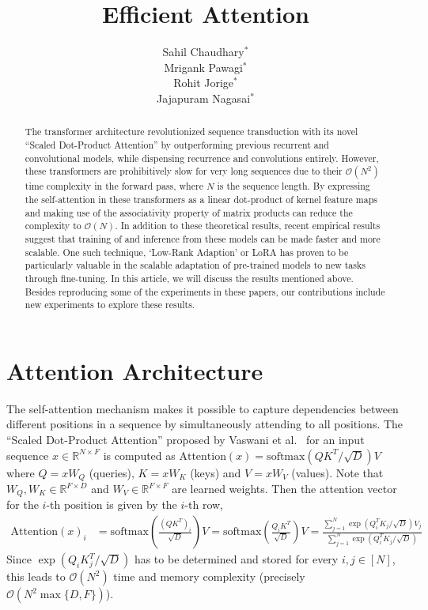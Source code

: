\documentclass{article}
\title{Efficient Attention}
\author{
  Sahil Chaudhary$^*$ \\
  \And
  Mrigank Pawagi$^*$ \\
  \And
  Rohit Jorige$^*$ \\
  \And
  Jajapuram Nagasai$^*$
}
\newcommand{\R}{\mathbb{R}}
\begin{document}
\maketitle

\def\thefootnote{*}
\def\thefootnote{\arabic{footnote}}

\begin{abstract}
    The transformer architecture revolutionized sequence transduction with its novel ``Scaled Dot-Product Attention'' by outperforming previous recurrent and convolutional models, while dispensing recurrence and convolutions entirely. However, these transformers are prohibitively slow for very long sequences due to their $\mathcal{O}(N^2)$ time complexity in the forward pass, where $N$ is the sequence length. By expressing the self-attention in these transformers as a linear dot-product of kernel feature maps and making use of the associativity property of matrix products can reduce the complexity to $\mathcal{O}(N)$. In addition to these theoretical results, recent empirical results suggest that training of and inference from these models can be made faster and more scalable. One such technique, `Low-Rank Adaption' or LoRA has proven to be particularly valuable in the scalable adaptation of pre-trained models to new tasks through fine-tuning. In this article, we will discuss the results mentioned above. Besides reproducing some of the experiments in these papers, our contributions include new experiments to explore these results.
\end{abstract}

\section{Attention Architecture}
    The self-attention mechanism makes it possible to capture dependencies between different positions in a sequence by simultaneously attending to all positions. The ``Scaled Dot-Product Attention'' proposed by Vaswani et al.~\cite{vaswaniAttention} for an input sequence $x \in \R^{N \times F}$ is computed as $\text{Attention}(x) = \text{softmax}(QK^T/\sqrt{D})V$
    where $Q = xW_Q$ (queries), $K = xW_K$ (keys) and $V = xW_V$ (values). Note that $W_Q, W_K \in \R^{F \times D}$ and $W_V \in \R^{F \times F}$ are learned weights. Then the attention vector for the $i$-th position is given by the $i$-th row,
    \begin{align*}
        \text{Attention}(x)_i &=\text{softmax}\left(\frac{(QK^T)_i}{\sqrt{D}} \right) V = \text{softmax}\left(\frac{Q_iK^T}{\sqrt{D}} \right) V = \frac{\sum_{j=1}^N \exp(Q_i^TK_j/\sqrt{D})V_j}{\sum_{j=1}^N \exp(Q_i^TK_j/\sqrt{D})} 
    \end{align*}
    Since $\exp(Q_i K_j^T / \sqrt{D})$ has to be determined and stored for every $i, j \in [N]$, this leads to $\mathcal{O}(N^2)$ time and memory complexity (precisely $\mathcal{O}(N^2\max\{D, F\})$).
\end{document}
